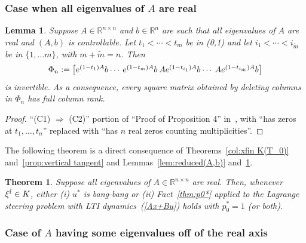 \documentclass[letterpaper,10pt,conference]{ieeeconf}
\def\R{{\mathbb{R}}}
\newtheorem{theorem}{Theorem} %
\newtheorem{lemma}{Lemma} %
\begin{document}
\subsubsection{Case when all eigenvalues of $A$ are real}
\label{AwithRealEvalues}


\begin{lemma}
\label{lem:PA2021,Prop3.2}
Suppose $A\in\R^{n\times n}$ and $b\in\R^n$ are such that all eigenvalues
of $A$ are real and $(A,b)$ is controllable. 
Let $t_1<\cdots<t_m$ be in (0,1) and let $i_1<\cdots<i_{\tilde m}$ be in $\{1,\dots m\}$, with $m + \tilde m = n$.
Then 
{\small
\[
\setlength{\arraycolsep}{1pt}
\Phi_n:=\begin{bmatrix} 
e^{(1-t_1)A}b & \cdots & e^{(1-t_m)A}b & A e^{(1-t_{i_1})A}b & \cdots 
& A e^{(1-t_{i_{\tilde m}})A}b \end{bmatrix}
\]
}
is invertible. As a consequence, every square matrix obtained by deleting 
columns in $\Phi_n$ has full column rank.  
\end{lemma}
\begin{proof}
``(C1) $\Rightarrow$ (C2)'' portion of 
``Proof of Proposition 4'' in~\cite{AbsilTits2024}, with 
``has zeros at $t_1,\dots,t_n$'' replaced with ``has $n$ real zeros 
counting multiplicities''.
\end{proof}


\noindent
The following theorem is a direct consequence of 
Theorems~\ref{col:xfin K(T_0)}
and~\ref{prop:vertical tangent} and 
Lemmas~\ref{lem:reduced(A,b)} and~\ref{lem:PA2021,Prop3.2}.
\begin{theorem}
\label{thm:PhiNonsingular}
Suppose all eigenvalues of  $A\in\R^{n\times n}$ are real.
Then, whenever $\xi^{\rm f}\in K$, %
either (i) $u^*$ is bang-bang or (ii) Fact~\ref{thm:p0*} applied to 
the Lagrange steering problem with LTI dynamics~(\ref{Ax+Bu}) holds 
with $p_0^*=1$ (or both).
\end{theorem}

\subsubsection{Case of $A$ having some eigenvalues off of the real axis}
\label{SomeComplexEvalues}
\end{document}
